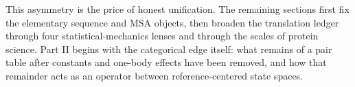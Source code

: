 This asymmetry is the price of honest unification.  The remaining sections first fix the elementary
sequence and MSA objects, then broaden the translation ledger through four statistical-mechanics
lenses and through the scales of protein science.  Part II begins with the categorical edge itself:
what remains of a pair table after constants and one-body effects have been removed, and how that
remainder acts as an operator between reference-centered state spaces.

